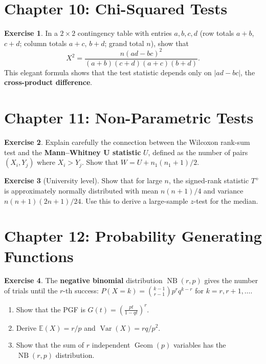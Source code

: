 \documentclass[12pt, a4paper, oneside]{book}
\theoremstyle{definition}
\newtheorem{exercise}{Exercise}[section]
\theoremstyle{plain}
\theoremstyle{remark}
\newcommand{\E}{\mathbb{E}}
\newcommand{\Var}{\operatorname{Var}}
\begin{document}
\section*{Chapter 10: Chi-Squared Tests}

\begin{exercise}
In a $2\times2$ contingency table with entries $a,b,c,d$ (row totals $a+b$,
$c+d$; column totals $a+c$, $b+d$; grand total $n$), show that
\[
  X^2 = \frac{n(ad-bc)^2}{(a+b)(c+d)(a+c)(b+d)}.
\]
This elegant formula shows that the test statistic depends only on
$|ad-bc|$, the \textbf{cross-product difference}.
\end{exercise}

\section*{Chapter 11: Non-Parametric Tests}

\begin{exercise}
Explain carefully the connection between the Wilcoxon rank-sum test and
the \textbf{Mann--Whitney U statistic} $U$, defined as the number of
pairs $(X_i,Y_j)$ where $X_i>Y_j$.  Show that $W = U + n_1(n_1+1)/2$.
\end{exercise}

\begin{exercise}[University level]
Show that for large $n$, the signed-rank statistic $T^+$ is approximately
normally distributed with mean $n(n+1)/4$ and variance $n(n+1)(2n+1)/24$.
Use this to derive a large-sample $z$-test for the median.
\end{exercise}

\section*{Chapter 12: Probability Generating Functions}

\begin{exercise}
The \textbf{negative binomial} distribution $\operatorname{NB}(r,p)$ gives
the number of trials until the $r$-th success:
$P(X=k) = \binom{k-1}{r-1}p^r q^{k-r}$ for $k=r,r+1,\ldots$.
\begin{enumerate}[label=\textbf{(\alph*)}]
  \item Show that the PGF is $G(t) = \left(\frac{pt}{1-qt}\right)^r$.
  \item Derive $\E(X)=r/p$ and $\Var(X)=rq/p^2$.
  \item Show that the sum of $r$ independent $\operatorname{Geom}(p)$
        variables has the $\operatorname{NB}(r,p)$ distribution.
\end{enumerate}
\end{exercise}
\end{document}
